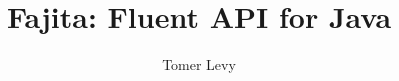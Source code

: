 \documentclass[t]{beamer}
\title{Fajita: Fluent API for Java}
\author{Tomer Levy}
\begin{document}
\begin{frame}
\maketitle
\end{frame}
\end{document}
